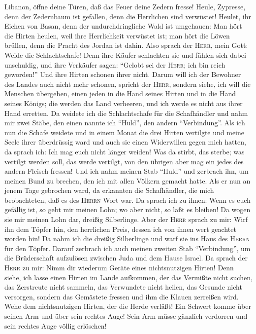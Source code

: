  Libanon, öffne deine Türen, daß das Feuer deine Zedern
fresse!  Heule, Zypresse, denn der Zedernbaum ist
gefallen, denn die Herrlichen sind verwüstet! Heulet, ihr Eichen von
Basan, denn der undurchdringliche Wald ist umgehauen:  Man
hört die Hirten heulen, weil ihre Herrlichkeit verwüstet ist; man hört
die Löwen brüllen, denn die Pracht des Jordan ist dahin. 
Also sprach der \textsc{Herr}, mein Gott: Weide die Schlachtschafe!
 Denn ihre Käufer schlachten sie und fühlen sich dabei
unschuldig, und ihre Verkäufer sagen: ``Gelobt sei der \textsc{Herr};
ich bin reich geworden!'' Und ihre Hirten schonen ihrer nicht.
 Darum will ich der Bewohner des Landes auch nicht mehr
schonen, spricht der \textsc{Herr}, sondern siehe, ich will die Menschen
übergeben, einen jeden in die Hand seines Hirten und in die Hand seines
Königs; die werden das Land verheeren, und ich werde es nicht aus ihrer
Hand erretten.  Da weidete ich die Schlachtschafe für die
Schafhändler und nahm mir zwei Stäbe, den einen nannte ich ``Huld'', den
andern ``Verbindung''.  Als ich nun die Schafe weidete und
in einem Monat die drei Hirten vertilgte und meine Seele ihrer
überdrüssig ward und auch sie einen Widerwillen gegen mich hatten,
 da sprach ich: Ich mag euch nicht länger weiden! Was da
stirbt, das sterbe; was vertilgt werden soll, das werde vertilgt, von
den übrigen aber mag ein jedes des andern Fleisch fressen!
 Und ich nahm meinen Stab ``Huld'' und zerbrach ihn, um
meinen Bund zu brechen, den ich mit allen Völkern gemacht hatte.
 Als er nun an jenem Tage gebrochen ward, da erkannten
die Schafhändler, die mich beobachteten, daß es des \textsc{Herrn} Wort
war.  Da sprach ich zu ihnen: Wenn es euch gefällig ist,
so gebt mir meinen Lohn; wo aber nicht, so laßt es bleiben! Da wogen sie
mir meinen Lohn dar, dreißig Silberlinge.  Aber der
\textsc{Herr} sprach zu mir: Wirf ihn dem Töpfer hin, den herrlichen
Preis, dessen ich von ihnen wert geachtet worden bin! Da nahm ich die
dreißig Silberlinge und warf sie ins Haus des \textsc{Herrn} für den
Töpfer.  Darauf zerbrach ich auch meinen zweiten Stab
``Verbindung'', um die Brüderschaft aufzulösen zwischen Juda und dem
Hause Israel.  Da sprach der \textsc{Herr} zu mir: Nimm
dir wiederum Geräte eines nichtsnutzigen Hirten!  Denn
siehe, ich lasse einen Hirten im Lande aufkommen, der das Vermißte nicht
suchen, das Zerstreute nicht sammeln, das Verwundete nicht heilen, das
Gesunde nicht versorgen, sondern das Gemästete fressen und ihm die
Klauen zerreißen wird.  Wehe dem nichtsnutzigen Hirten,
der die Herde verläßt! Ein Schwert komme über seinen Arm und über sein
rechtes Auge! Sein Arm müsse gänzlich verdorren und sein rechtes Auge
völlig erlöschen!

